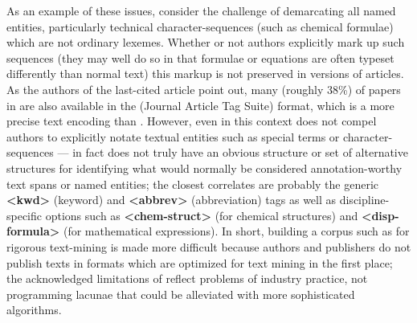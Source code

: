 {As an example of these \NLP{} issues, 
consider the challenge of demarcating all 
named entities, particularly technical 
character-sequences (such as chemical 
formulae) which are not ordinary lexemes.  
Whether or not authors explicitly mark up 
such sequences (they may well do so in that 
formulae or equations are often typeset 
differently than normal text) this markup is 
not preserved in \PDF{} versions of articles.  
As the authors of the last-cited article point 
out, many (roughly 38\%) of papers in \Cnineteen{} 
are also available in the \JATS{} (Journal Article Tag Suite) 
format, which is a more precise text encoding 
than \PDF{}.  However, even in this context \JATS{} 
does not compel authors to explicitly notate 
textual entities such as special terms or 
character-sequences --- in fact \JATS{} 
does not truly have an obvious structure or 
set of alternative structures for identifying
what would normally be considered annotation-worthy  
text spans or named entities; the closest correlates 
are probably the generic \textbf{<kwd>} (keyword) and 
\textbf{<abbrev>} (abbreviation) tags as well 
as discipline-specific options such as 
\textbf{<chem-struct>} (for chemical structures) 
and \textbf{<disp-formula>} (for mathematical expressions).  
In short, building a corpus such as \Cnineteen{} for 
rigorous text-mining is made more difficult because 
authors and publishers do not publish texts in 
formats which are optimized for text mining in the 
first place; the acknowledged limitations of 
\Cnineteen{} reflect problems of industry 
practice, not programming lacunae that could 
be alleviated with more sophisticated \NLP{} algorithms.}

